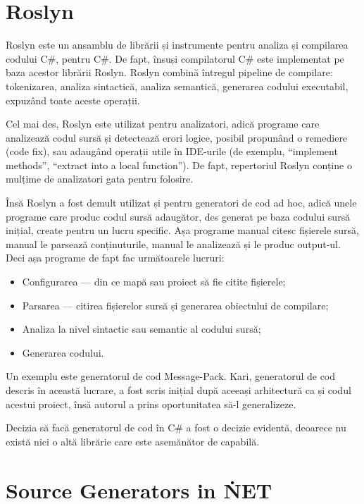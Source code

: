 \documentclass{report}
\begin{document}
\section{Roslyn}


Roslyn este un ansamblu de librării și instrumente pentru analiza și compilarea codului C\#, pentru C\#.
De fapt, însuși compilatorul C\# este implementat pe baza acestor librării Roslyn.
Roslyn combină întregul pipeline de compilare: tokenizarea, analiza sintactică, analiza semantică, generarea codului executabil, expuzând toate aceste operații.

Cel mai des, Roslyn este utilizat pentru analizatori, adică programe care analizează codul sursă și detectează erori logice, posibil propunând o remediere (code fix), sau adaugând operații utile în IDE-urile (de exemplu, ``implement methods'', ``extract into a local function'').
De fapt, repertoriul Roslyn conține o mulțime de analizatori gata pentru folosire.

Însă Roslyn a fost demult utilizat și pentru generatori de cod ad hoc, adică unele programe care produc codul sursă adaugător, des generat pe baza codului sursă inițial, create pentru un lucru specific.
Așa programe manual citesc fișierele sursă, manual le parsează conținuturile, manual le analizează și le produc output-ul.
Deci așa programe de fapt fac următoarele lucruri:

\begin{itemize}
  \item Configurarea --- din ce mapă sau proiect să fie citite fișierele;
  \item Parsarea --- citirea fișierelor sursă și generarea obiectului de compilare;
  \item Analiza la nivel sintactic sau semantic al codului sursă;
  \item Generarea codului.
\end{itemize}

Un exemplu este generatorul de cod Message-Pack\cite{message_pack_github}.
Kari, generatorul de cod descris în această lucrare, a fost scris inițial după aceeași arhitectură ca și codul acestui proiect, însă autorul a prins oportunitatea să-l generalizeze.

Decizia să facă generatorul de cod în C\# a fost o decizie evidentă, deoarece nu există nici o altă librărie care este asemănător de capabilă.

\section{Source Generators in \. NET}
\end{document}
